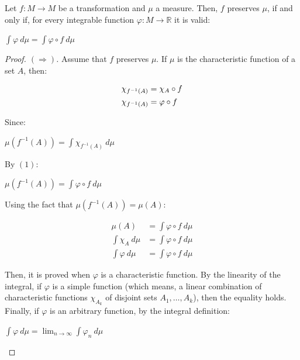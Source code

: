 \documentclass[10pt,a4paper]{amsart}
\begin{document}
\begin{proposition}
    Let $f : M \to M$ be a transformation and $\mu$ a measure. Then, $f$ preserves $\mu$, if and only if, for every integrable function $\varphi : M \to \mathbb{R}$ it is valid: 

\begin{center}
    $\displaystyle \int \varphi\ d\mu = \displaystyle \int \varphi \circ f\ d\mu$
\end{center}
\end{proposition}

\begin{proof}[Proof. \( (\Rightarrow) \)]
Assume that $f$ preserves $\mu$. If $\mu$ is the characteristic function of a set $A$, then:

\begin{align}
\chi_{f^{-1}(A)} &= \chi_A \circ f \notag \\
\chi_{f^{-1}(A)} &= \varphi \circ f
\end{align}

 Since:
\begin{center}
    $\mu(f^{-1}(A)) = \displaystyle \int \chi_{f^{-1}(A)}\ d\mu$
\end{center}

 By $(1)$:
\begin{center}
    $\mu(f^{-1}(A)) = \displaystyle \int \varphi \circ f\ d\mu$
\end{center}

 Using the fact that $\mu(f^{-1}(A)) = \mu(A)$:

\begin{align*}
    \mu(A) &= \displaystyle \int \varphi \circ f\ d\mu\\
    \displaystyle \int \chi_A\ d\mu &= \displaystyle \int \varphi \circ f\ d\mu\\
    \displaystyle \int \varphi\ d\mu &= \displaystyle \int \varphi \circ f\ d\mu
\end{align*}

 Then, it is proved when $\varphi$ is a characteristic function. By the linearity of the integral, if $\varphi$ is a simple function (which means, a linear combination of characteristic functions $\chi_{A_k}$ of disjoint sets $A_1,\dots,A_k$), then the equality holds. Finally, if $\varphi$ is an arbitrary function, by the integral definition:

\begin{center}
    $\displaystyle \int \varphi\ d\mu = \lim_{n \to \infty} \displaystyle \int \varphi_n\ d\mu$
\end{center}


\end{proof}
\end{document}
